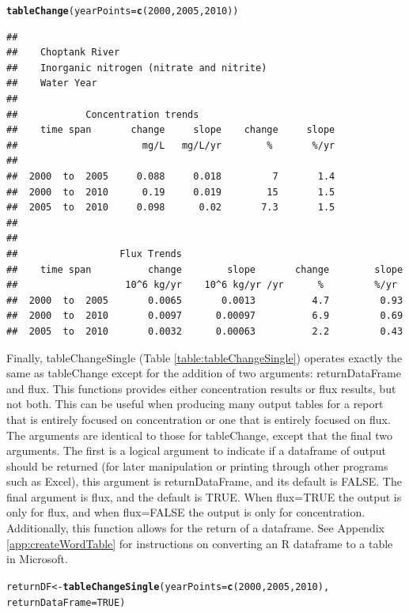 \documentclass[a4paper,11pt]{article}\usepackage{graphicx, color}
\makeatletter
\newcommand{\hlfunctioncall}[1]{\textcolor[rgb]{0.501960784313725,0,0.329411764705882}{\textbf{#1}}}%
\newenvironment{kframe}{%
 \def\at@end@of@kframe{}%
 \ifinner\ifhmode%
  \def\at@end@of@kframe{\end{minipage}}%
  \begin{minipage}{\columnwidth}%
 \fi\fi%
 \def\FrameCommand##1{\hskip\@totalleftmargin \hskip-\fboxsep
 \colorbox{shadecolor}{##1}\hskip-\fboxsep
     \hskip-\linewidth \hskip-\@totalleftmargin \hskip\columnwidth}%
 \MakeFramed {\advance\hsize-\width
   \@totalleftmargin\z@ \linewidth\hsize
   \@setminipage}}%
 {\par\unskip\endMakeFramed%
 \at@end@of@kframe}
\newenvironment{knitrout}{}{} %
\makeatother
\begin{document}
\begin{knitrout}
\color{fgcolor}\begin{kframe}
\begin{alltt}
\hlfunctioncall{tableChange}(yearPoints=\hlfunctioncall{c}(2000,2005,2010))
\end{alltt}
\begin{verbatim}
## 
##    Choptank River 
##    Inorganic nitrogen (nitrate and nitrite)
##    Water Year 
## 
##            Concentration trends
##    time span       change     slope    change     slope
##                      mg/L   mg/L/yr        %       %/yr
## 
##  2000  to  2005     0.088     0.018         7       1.4
##  2000  to  2010      0.19     0.019        15       1.5
##  2005  to  2010     0.098      0.02       7.3       1.5
## 
## 
##                  Flux Trends
##    time span          change        slope       change        slope
##                   10^6 kg/yr    10^6 kg/yr /yr      %         %/yr
##  2000  to  2005       0.0065       0.0013          4.7         0.93
##  2000  to  2010       0.0097      0.00097          6.9         0.69
##  2005  to  2010       0.0032      0.00063          2.2         0.43
\end{verbatim}
\end{kframe}
\end{knitrout}


Finally, tableChangeSingle (Table \ref{table:tableChangeSingle}) operates exactly the same as tableChange except for the addition of two arguments: returnDataFrame and flux. This functions provides either concentration results or flux results, but not both.  This can be useful when producing many output tables for a report that is entirely focused on concentration or one that is entirely focused on flux.  The arguments are identical to those for tableChange, except that the final two arguments.  The first is a logical argument to indicate if a dataframe of output should be returned (for later manipulation or printing through other programs such as Excel), this argument is returnDataFrame, and its default is FALSE.  The final argument is flux, and the default is TRUE.  When flux=TRUE the output is only for flux, and when flux=FALSE the output is only for concentration.  Additionally, this function allows for the return of a dataframe.  See Appendix \ref{app:createWordTable} for instructions on converting an R dataframe to a table in Microsoft.

\begin{knitrout}
\color{fgcolor}\begin{kframe}
\begin{alltt}
returnDF <- \hlfunctioncall{tableChangeSingle}(yearPoints=\hlfunctioncall{c}(2000,2005,2010), 
                              returnDataFrame=TRUE)
\end{alltt}
\end{kframe}
\end{knitrout}
\end{document}
